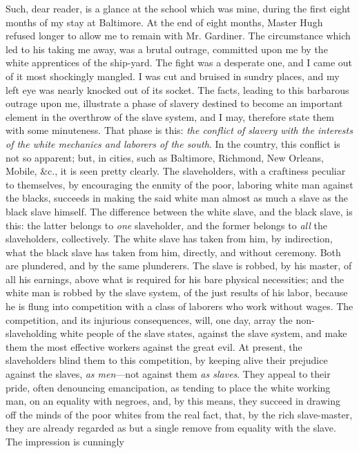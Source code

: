 Such, dear reader, is a glance at the school which was mine, during the
first eight months of my stay at Baltimore. At the end of eight months,
Master Hugh refused longer to allow me to remain with Mr. Gardiner. The
circumstance which led to his taking me away, was a brutal outrage,
committed upon me by the white apprentices of the ship-yard. The fight
was a desperate one, and I came out of it most shockingly mangled. I was
cut and bruised in sundry places, and my left eye was nearly knocked out
of its socket. The facts, leading to this barbarous outrage upon me,
illustrate a phase of slavery destined to become an important element in
the overthrow of the slave system, and I may, therefore state them with
some minuteness. That phase is this: \emph{the conflict of slavery with
the interests of the white mechanics and laborers of the south}. In the
country, this conflict is not so apparent; but, in cities, such as
Baltimore, Richmond, New Orleans, Mobile, \&c., it is seen pretty
clearly. The slaveholders, with a craftiness peculiar
{\protect\hypertarget{310}{}{}}to themselves, by encouraging the enmity
of the poor, laboring white man against the blacks, succeeds in making
the said white man almost as much a slave as the black slave himself.
The difference between the white slave, and the black slave, is this:
the latter belongs to \emph{one} slaveholder, and the former belongs to
\emph{all} the slaveholders, collectively. The white slave has taken
from him, by indirection, what the black slave has taken from him,
directly, and without ceremony. Both are plundered, and by the same
plunderers. The slave is robbed, by his master, of all his earnings,
above what is required for his bare physical necessities; and the white
man is robbed by the slave system, of the just results of his labor,
because he is flung into competition with a class of laborers who work
without wages. The competition, and its injurious consequences, will,
one day, array the non-slaveholding white people of the slave states,
against the slave system, and make them the most effective workers
against the great evil. At present, the slaveholders blind them to this
competition, by keeping alive their prejudice against the slaves,
\emph{as men}---not against them \emph{as slaves}. They appeal to their
pride, often denouncing emancipation, as tending to place the white
working man, on an equality with negroes, and, by this means, they
succeed in drawing off the minds of the poor whites from the real fact,
that, by the rich slave-master, they are already regarded as but a
single remove from equality with the slave. The impression is cunningly
